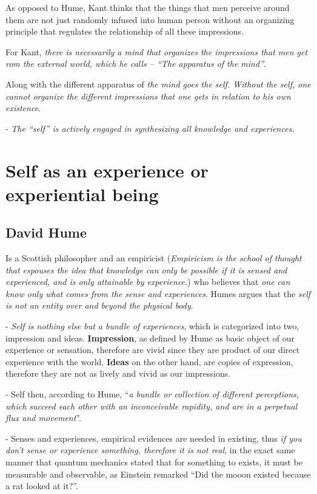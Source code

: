 \documentclass[12pt, UTF8]{article}
\begin{document}
	As opposed to Hume, Kant thinks that the things that men perceive around them are not just randomly infused into human person without an organizing principle that regulates the relationship of all these impressions.
	
	For Kant, \emph{there is necessarily a mind that organizes the impressions that men get rom the external world, which he calls -- ``The apparatus of the mind''}.
	
	Along with the different apparatus of \textit{the mind goes the self. Without the self, one cannot organize the different impressions that one gets in relation to his own existence}.
	
	- \emph{The ``self'' is actively engaged in synthesizing all knowledge and experiences}.
	
	\section{Self as an experience or experiential being}
	
	\subsection*{David Hume}
	
	Is a Scottish philosopher and an empiricist (\textit{Empiricism is the school of thought that espouses the idea that knowledge can only be possible if it is sensed and experienced, and is only attainable by experience.}) who believes that \emph{one can know only what comes from the sense and experiences}. Humes argues that the \emph{self is not an entity over and beyond the physical body}.
	
	- \emph{Self is nothing else but a bundle of experiences}, which is categorized into two, impression and ideas. \textbf{Impression}, as defined by Hume as basic object of our experience or sensation, therefore are vivid since they are product of our direct experience with the world. \textbf{Ideas} on the other hand, are copies of expression, therefore they are not as lively and vivid as our impressions.
	
	- Self then, according to Hume, ``\emph{a bundle or collection of different perceptions, which succeed each other with an inconceivable rapidity, and are in a perpetual flux and movement}''.
	
	- Senses and experiences, empirical evidences are needed in existing, thus \textit{if you don't sense or experience something, therefore it is not real}, in the exact same manner that quantum mechanics stated that for something to exists, it must be measurable and observable, as Einstein remarked ``Did the mooon existed because a rat looked at it?''.
	
\end{document}
